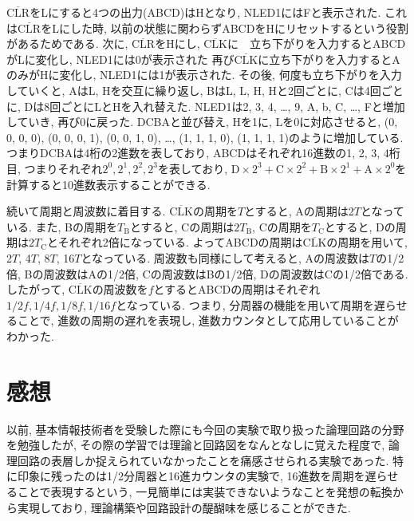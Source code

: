 \documentclass[a4paper, 11pt, uplatex]{jsarticle}
\begin{document}
$\overline{\mathrm{CLR}}$をLにすると4つの出力(ABCD)はHとなり,  NLED1にはFと表示された.
これは$\overline{\mathrm{CLR}}$をLにした時,  以前の状態に関わらずABCDをHにリセットするという役割があるためである.
次に,  $\overline{\mathrm{CLR}}$をHにし,  $\overline{\mathrm{CLK}}$に　立ち下がりを入力するとABCDがLに変化し,  NLED1には0が表示された
再び$\overline{\mathrm{CLK}}$に立ち下がりを入力するとAのみがHに変化し,  NLED1には1が表示された.
その後,  何度も立ち下がりを入力していくと,  AはL, Hを交互に繰り返し,  BはL, L, H, Hと2回ごとに,  Cは4回ごとに,  Dは8回ごとにLとHを入れ替えた.
NLED1は2,  3,  4,  \dots,  9,  A,  b,  C,  \dots,  Fと増加していき,  再び0に戻った.
DCBAと並び替え,  Hを1に,  Lを0に対応させると,  (0, 0, 0, 0), (0, 0, 0, 1), (0, 0, 1, 0), \dots,  (1, 1, 1, 0), (1, 1, 1, 1)のように増加している.
つまりDCBAは4桁の2進数を表しており,  ABCDはそれぞれ16進数の1, 2, 3, 4桁目, つまりそれぞれ$2^0, 2^1, 2^2, 2^3$を表しており,
$\mathrm{D} \times 2^3 + \mathrm{C} \times 2^2 + \mathrm{B} \times 2^1 + \mathrm{A} \times 2^0$を計算すると10進数表示することができる.
\par
続いて周期と周波数に着目する.
$\overline{\mathrm{CLK}}$の周期を$T$とすると, Aの周期は2$T$となっている.
また, Bの周期を$T_\mathrm{B}$とすると,  Cの周期は$2T_\mathrm{B}$,  Cの周期を$T_\mathrm{C}$とすると,  Dの周期は$2T_\mathrm{C}$とそれぞれ2倍になっている.
よってABCDの周期は$\overline{\mathrm{CLK}}$の周期を用いて,  2$T$,  4$T$,  8$T$,  16$T$となっている.
周波数も同様にして考えると,  Aの周波数は$T$の1/2倍,  Bの周波数はAの1/2倍,  Cの周波数はBの1/2倍,  Dの周波数はCの1/2倍である.
したがって,  $\overline{\mathrm{CLK}}$の周波数を$f$とするとABCDの周期はそれぞれ$1/2f,  1/4f,  1/8f,  1/16f$となっている.
つまり,  分周器の機能を用いて周期を遅らせることで,  進数の周期の遅れを表現し,  進数カウンタとして応用していることがわかった.

\section{感想}
以前, 基本情報技術者を受験した際にも今回の実験で取り扱った論理回路の分野を勉強したが, その際の学習では理論と回路図をなんとなしに覚えた程度で,
論理回路の表層しか捉えられていなかったことを痛感させられる実験であった.
特に印象に残ったのは1/2分周器と16進カウンタの実験で, 16進数を周期を遅らせることで表現するという, 一見簡単には実装できないようなことを発想の転換から実現しており, 
理論構築や回路設計の醍醐味を感じることができた.
\end{document}
